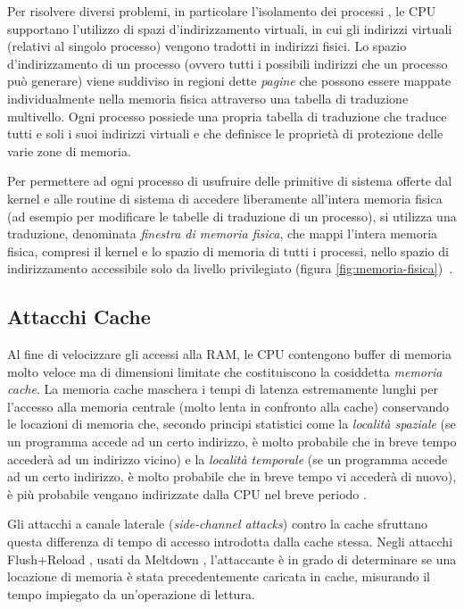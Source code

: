 Per risolvere diversi problemi, in particolare l'isolamento dei processi \cite{lettieri:paginazione}, le CPU supportano l'utilizzo di spazi d'indirizzamento virtuali, in cui gli indirizzi virtuali (relativi al singolo processo) vengono tradotti in indirizzi fisici. 
Lo spazio d'indirizzamento di un processo (ovvero tutti i possibili indirizzi che un processo può generare) viene suddiviso in regioni dette \emph{pagine} che possono essere mappate individualmente nella memoria fisica attraverso una tabella di traduzione multivello. 
Ogni processo possiede una propria tabella di traduzione che traduce tutti e soli i suoi indirizzi virtuali e che definisce le proprietà di protezione delle varie zone di memoria. 

Per permettere ad ogni processo di usufruire delle primitive di sistema offerte dal kernel e alle routine di sistema di accedere liberamente all'intera memoria fisica (ad esempio per modificare le tabelle di traduzione di un processo), si utilizza una traduzione, denominata \emph{finestra di memoria fisica}, che mappi l'intera memoria fisica, compresi il kernel e lo spazio di memoria di tutti i processi, nello spazio di indirizzamento accessibile solo da livello privilegiato (figura \vref{fig:memoria-fisica})~\cite{lettieri:paginazione-complementi}.


\subsection{Attacchi Cache}
Al fine di velocizzare gli accessi alla RAM, le CPU contengono buffer di memoria molto veloce ma di dimensioni limitate che costituiscono la cosiddetta \emph{memoria cache}. La memoria cache maschera i tempi di latenza estremamente lunghi per l'accesso alla memoria centrale (molto lenta in confronto alla cache) conservando le locazioni di memoria che, secondo principi statistici come la \emph{località spaziale} (se un programma accede ad un certo indirizzo, è molto probabile che in breve tempo accederà ad un indirizzo vicino)  e la \emph{località temporale} (se un programma accede ad un certo indirizzo, è molto probabile che in breve tempo vi accederà di nuovo), è più probabile vengano indirizzate dalla CPU nel breve periodo \cite{lettieri:cache}.

Gli attacchi a canale laterale (\emph{side-channel attacks}) contro la cache sfruttano questa differenza di tempo di accesso introdotta dalla cache stessa. Negli attacchi Flush+Reload \cite{yaron:flush-reload}, usati da Meltdown \cite{lipp:meltdown}, l'attaccante è in grado di determinare se una locazione di memoria è stata precedentemente caricata in cache, misurando il tempo impiegato da un'operazione di lettura.

